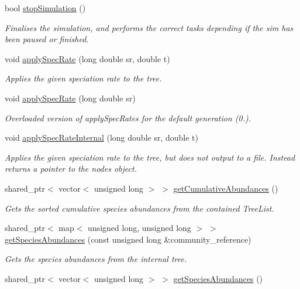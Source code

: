 \begin{DoxyCompactItemize}
bool \hyperlink{class_tree_afd6bd75c301d2f57c4997fcfc92f192e}{stop\+Simulation} ()
\begin{DoxyCompactList}\small\item\em Finalises the simulation, and performs the correct tasks depending if the sim has been paused or finished. \end{DoxyCompactList}\item 
void \hyperlink{class_tree_aa6349a32b3fcfb82a5f8311b11db3982}{apply\+Spec\+Rate} (long double sr, double t)
\begin{DoxyCompactList}\small\item\em Applies the given speciation rate to the tree. \end{DoxyCompactList}\item 
void \hyperlink{class_tree_ab699328f13b22f48faa63a5638e907db}{apply\+Spec\+Rate} (long double sr)
\begin{DoxyCompactList}\small\item\em Overloaded version of apply\+Spec\+Rates for the default generation (0.). \end{DoxyCompactList}\item 
void \hyperlink{class_tree_ac89abe0404d05d0363258b72cb80700b}{apply\+Spec\+Rate\+Internal} (long double sr, double t)
\begin{DoxyCompactList}\small\item\em Applies the given speciation rate to the tree, but does not output to a file. Instead returns a pointer to the nodes object. \end{DoxyCompactList}\item 
shared\+\_\+ptr$<$ vector$<$ unsigned long $>$ $>$ \hyperlink{class_tree_ad84f38d8a8347b53c8fd77e0dc3e1f90}{get\+Cumulative\+Abundances} ()
\begin{DoxyCompactList}\small\item\em Gets the sorted cumulative species abundances from the contained Tree\+List. \end{DoxyCompactList}\item 
shared\+\_\+ptr$<$ map$<$ unsigned long, unsigned long $>$ $>$ \hyperlink{class_tree_a3dafbfba14cf2a12a24ddd2c90bfd3fc}{get\+Species\+Abundances} (const unsigned long \&community\+\_\+reference)
\begin{DoxyCompactList}\small\item\em Gets the species abundances from the internal tree. \end{DoxyCompactList}\item 
shared\+\_\+ptr$<$ vector$<$ unsigned long $>$ $>$ \hyperlink{class_tree_ac369b24b2b52b84b558220b9158806f8}{get\+Species\+Abundances} ()

\end{DoxyCompactItemize}

